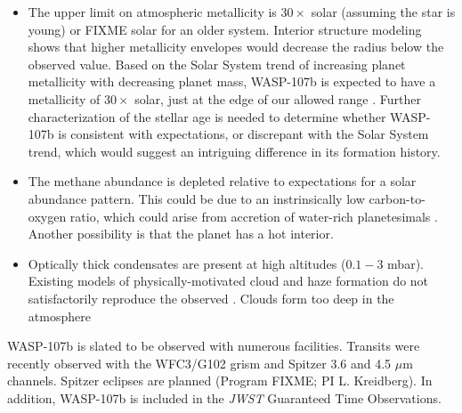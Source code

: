 \documentclass[twocolumn]{aastex61}
\begin{document}
\begin{itemize}
\item{The upper limit on atmospheric metallicity is $30\times$ solar (assuming the star is young) or FIXME solar for an older system.  Interior structure modeling shows that higher metallicity envelopes would decrease the radius below the observed value.  Based on the Solar System trend of increasing planet metallicity with decreasing planet mass, WASP-107b is expected to have a metallicity of $30\times$ solar, just at the edge of our allowed range \citep{kreidberg14b}. Further characterization of the stellar age is needed to determine whether WASP-107b is consistent with expectations, or discrepant with the Solar System trend, which would suggest an intriguing difference in its formation history.}
\item{The methane abundance is depleted relative to expectations for a solar abundance pattern. This could be due to an instrinsically low carbon-to-oxygen ratio, which could arise from accretion of water-rich planetesimals \citep{mordasini16, espinoza17}.   Another possibility is that the planet has a hot interior.}
\item{Optically thick condensates are present at high altitudes ($0.1 - 3$ mbar).  Existing models of physically-motivated cloud and haze formation do not satisfactorily reproduce the observed . Clouds form too deep in the atmosphere }
\end{itemize}






WASP-107b is slated to be observed with numerous facilities. Transits were recently observed with the WFC3/G102 grism and Spitzer 3.6 and 4.5 $\mu$m channels. Spitzer eclipses are planned (Program FIXME; PI L. Kreidberg). In addition, WASP-107b is included in the \emph{JWST} Guaranteed Time Observations.
\end{document}
